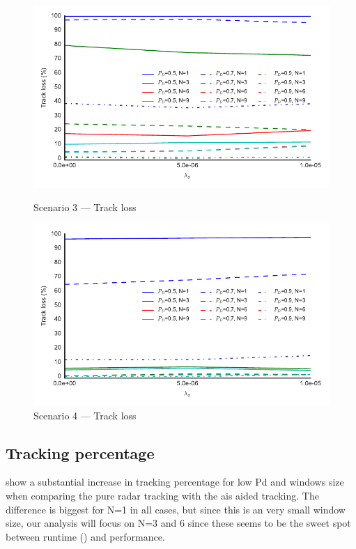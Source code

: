 \begin{figure}
\centering
\includegraphics{Figures/plots/Scenario3_Tracking-TrackLoss.pdf}
\caption{Scenario 3 --- Track loss}\label{fig:scenario3_track_loss}
\includegraphics{Figures/plots/Scenario4_Tracking-TrackLoss.pdf}
\caption{Scenario 4 --- Track loss}\label{fig:scenario4_track_loss}
\end{figure}
\clearpage

\subsection{Tracking percentage}
 show a substantial increase in tracking percentage for low \gls{Pd} and windows size when comparing the pure radar tracking with the \gls{ais} aided tracking. The difference is biggest for N=1 in all cases, but since this is an very small window size, our analysis will focus on N=3 and 6 since these seems to be the sweet spot between runtime () and performance. 

